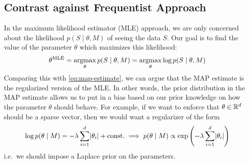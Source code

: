 \subsection{Contrast against Frequentist Approach}

In the maximum likelihood estimator (MLE) approach, we are only concerned about
the likelihood $p(S \mid \theta, M)$ of seeing the data $S$. Our goal is to find
the value of the parameter $\theta$ which maximizes this likelihood:
\begin{equation}
  \theta^\text{MLE} = \operatorname*{argmax}_\theta p(S \mid \theta, M) = \operatorname*{argmax}_\theta \log
  p(S \mid \theta, M)
\end{equation}
Comparing this with \eqref{eq:map-estimate}, we can argue that the MAP estimate
is the regularized version of the MLE. In other words, the prior distribution in
the MAP estimate allows us to put in a bias based on our prior knowledge on how
the parameter $\theta$ should behave. For example, if we want to enforce that
$\theta \in \mathbb{R}^d$ should be a sparse vector, then we would want a regularizer
of the form
\begin{equation}
  \log p(\theta \mid M) = - \lambda \sum_{i = 1}^d \lvert\theta_i\rvert +
  \text{const.} \implies p(\theta \mid M) \propto \exp\left(-\lambda \sum_{i =
  1}^d \lvert\theta_i\rvert\right)
\end{equation}
i.e.\ we should impose a Laplace prior on the parameters.

%
